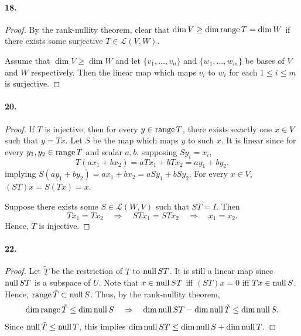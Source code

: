   \paragraph{18.}
  \begin{proof}
    By the rank-nullity theorem, clear that $\dim V \ge \dim\operatorname{range} T =\dim W$ if
    there exists some surjective $T\in\mathcal{L}(V,W)$. \par
    Assume that $\dim V\ge\dim W$ and let $\{v_1,\dots,v_n\}$ and $\{w_1,\dots,
    w_m\}$ be bases of $V$ and $W$ respectively. Then the linear map which
    maps $v_i$ to $w_i$ for each $1\le i\le m$ is surjective.
  \end{proof}

  \paragraph{20.}
  \begin{proof}
    If $T$ is injective, then for every $y\in\operatorname{range} T$, there exists exactly 
    one $x\in V$ such that $y=Tx$. Let $S$ be the map which maps $y$ to such
    $x$. It is linear since for every $y_1,y_2\in\operatorname{range} T$ and scalar $a,b$,
    supposing $Sy_i = x_i$,
    \[
      T(ax_1+bx_2) = aTx_1 + bTx_2 = ay_1 + by_2.
    \]
    implying $S(ay_1+by_2) = ax_1+bx_2 = aSy_1 + bSy_2$. For every $x\in V$,
    $(ST)x = S(Tx) = x$. \par
    Suppose there exists some $S\in \mathcal{L}(W,V)$ such that $ST=I$. Then
    \[
      Tx_1 = Tx_2 \quad\Rightarrow\quad
      STx_1 = STx_2 \quad\Rightarrow\quad
      x_1 = x_2.
    \]
    Hence, $T$ is injective.
  \end{proof}

  \paragraph{22.}
  \begin{proof}
    Let $\tilde{T}$ be the restriction of $T$ to $\operatorname{null} ST$. It is still a linear
    map since $\operatorname{null} ST$ is a subspace of $U$. Note that $x\in\operatorname{null} ST$ iff $(ST)x
    =0$ iff $Tx\in\operatorname{null} S$. Hence, $\operatorname{range}\tilde{T}\subset\operatorname{null} S$. Thus, by the 
    rank-nullity theorem,
    \[
      \dim\operatorname{range}\tilde{T} \le \dim\operatorname{null} S \quad\Rightarrow\quad
      \dim\operatorname{null} ST - \dim\operatorname{null}\tilde{T} \le \dim\operatorname{null} S.
    \]
    Since $\operatorname{null}\tilde{T} \le \operatorname{null} T$, this implies $\dim\operatorname{null} ST \le \dim\operatorname{null} S +
    \dim\operatorname{null} T$.
  \end{proof}

